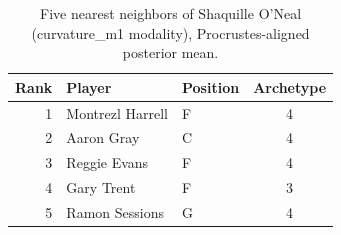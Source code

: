 \begin{table}[htbp]
  \centering\small
  \begin{tabular}{rllc}
    \toprule
    Rank & Player & Position & Archetype \\
    \midrule
    1 & Montrezl Harrell & F & 4 \\
    2 & Aaron Gray & C & 4 \\
    3 & Reggie Evans & F & 4 \\
    4 & Gary Trent & F & 3 \\
    5 & Ramon Sessions & G & 4 \\
    \bottomrule
  \end{tabular}
  \caption{Five nearest neighbors of Shaquille O'Neal (curvature_m1 modality), Procrustes-aligned posterior mean.}
  \label{tab:Shaquille_O_Neal_neighbors_curvature_m1}
\end{table}

